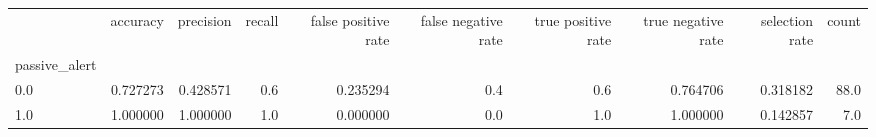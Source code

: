 \begin{tabular}{lrrrrrrrrr}
\toprule
{} &  accuracy &  precision &  recall &  false positive rate &  false negative rate &  true positive rate &  true negative rate &  selection rate &  count \\
passive\_alert &           &            &         &                      &                      &                     &                     &                 &        \\
\midrule
0.0           &  0.727273 &   0.428571 &     0.6 &             0.235294 &                  0.4 &                 0.6 &            0.764706 &        0.318182 &   88.0 \\
1.0           &  1.000000 &   1.000000 &     1.0 &             0.000000 &                  0.0 &                 1.0 &            1.000000 &        0.142857 &    7.0 \\
\bottomrule
\end{tabular}
